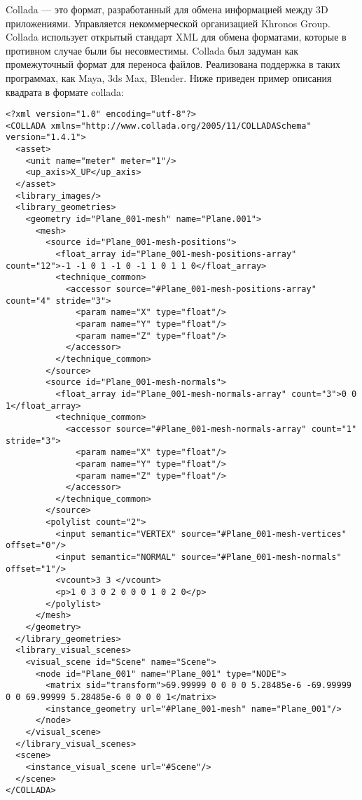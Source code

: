 Collada — это формат, разработанный для обмена  информацией между 3D приложениями.
Управляется некоммерческой организацией Khronos Group. Collada использует открытый стандарт XML для обмена форматами, которые в противном случае были бы несовместимы. Collada был задуман как промежуточный формат для переноса файлов.
Реализована поддержка в таких программах, как Maya, 3ds Max, Blender.
Ниже приведен пример описания квадрата в формате collada:
\begin{small}
\begin{verbatim}
<?xml version="1.0" encoding="utf-8"?>
<COLLADA xmlns="http://www.collada.org/2005/11/COLLADASchema" version="1.4.1">
  <asset>
    <unit name="meter" meter="1"/>
    <up_axis>X_UP</up_axis>
  </asset>
  <library_images/>
  <library_geometries>
    <geometry id="Plane_001-mesh" name="Plane.001">
      <mesh>
        <source id="Plane_001-mesh-positions">
          <float_array id="Plane_001-mesh-positions-array" count="12">-1 -1 0 1 -1 0 -1 1 0 1 1 0</float_array>
          <technique_common>
            <accessor source="#Plane_001-mesh-positions-array" count="4" stride="3">
              <param name="X" type="float"/>
              <param name="Y" type="float"/>
              <param name="Z" type="float"/>
            </accessor>
          </technique_common>
        </source>
        <source id="Plane_001-mesh-normals">
          <float_array id="Plane_001-mesh-normals-array" count="3">0 0 1</float_array>
          <technique_common>
            <accessor source="#Plane_001-mesh-normals-array" count="1" stride="3">
              <param name="X" type="float"/>
              <param name="Y" type="float"/>
              <param name="Z" type="float"/>
            </accessor>
          </technique_common>
        </source>
        <polylist count="2">
          <input semantic="VERTEX" source="#Plane_001-mesh-vertices" offset="0"/>
          <input semantic="NORMAL" source="#Plane_001-mesh-normals" offset="1"/>
          <vcount>3 3 </vcount>
          <p>1 0 3 0 2 0 0 0 1 0 2 0</p>
        </polylist>
      </mesh>
    </geometry>
  </library_geometries>
  <library_visual_scenes>
    <visual_scene id="Scene" name="Scene">
      <node id="Plane_001" name="Plane_001" type="NODE">
        <matrix sid="transform">69.99999 0 0 0 0 5.28485e-6 -69.99999 0 0 69.99999 5.28485e-6 0 0 0 0 1</matrix>
        <instance_geometry url="#Plane_001-mesh" name="Plane_001"/>
      </node>
    </visual_scene>
  </library_visual_scenes>
  <scene>
    <instance_visual_scene url="#Scene"/>
  </scene>
</COLLADA>
\end{verbatim}
\end{small}